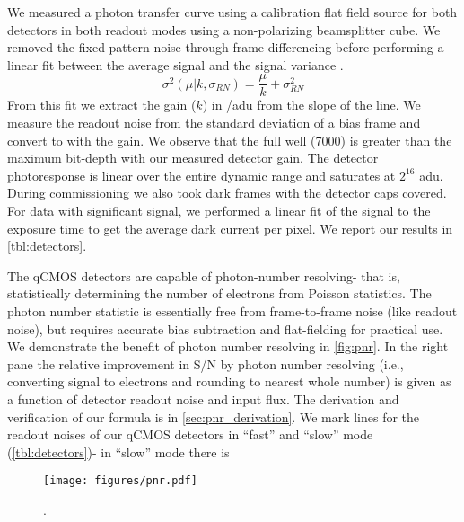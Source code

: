 We measured a photon transfer curve using a calibration flat field source for both detectors in both readout modes using a non-polarizing beamsplitter cube. We removed the fixed-pattern noise through frame-differencing before performing a linear fit between the average signal and the signal variance \citep{stefanov_cmos_2022}. 
\begin{equation}
    \sigma^2\left(\mu | k, \sigma_{RN}\right) = \frac{\mu}{k} + \sigma^2_{RN}
\end{equation}
From this fit we extract the gain ($k$) in \si{\electron/adu} from the slope of the line. We measure the readout noise from the standard deviation of a bias frame and convert to \si{\electron} with the gain. We observe that the full well (\SI{7000}{\electron}) is greater than the maximum bit-depth with our measured detector gain. The detector photoresponse is linear over the entire dynamic range and saturates at $2^{16}$ \si{adu}. During commissioning we also took dark frames with the detector caps covered. For data with significant signal, we performed a linear fit of the signal to the exposure time to get the average dark current per pixel. We report our results in \autoref{tbl:detectors}.

The qCMOS detectors are capable of photon-number resolving- that is, statistically determining the number of electrons from Poisson statistics. The photon number statistic is essentially free from frame-to-frame noise (like readout noise), but requires accurate bias subtraction and flat-fielding for practical use. We demonstrate the benefit of photon number resolving in \autoref{fig:pnr}. In the right pane the relative improvement in S/N by photon number resolving (i.e., converting signal to electrons and rounding to nearest whole number) is given as a function of detector readout noise and input flux. The derivation and verification of our formula is in \autoref{sec:pnr_derivation}. We mark lines for the readout noises of our qCMOS detectors in ``fast'' and ``slow'' mode (\autoref{tbl:detectors})- in ``slow'' mode there is 

\begin{figure}
    \centering
    \texttt{[image: figures/pnr.pdf]}
    \caption{.\label{fig:pnr}}
\end{figure}

